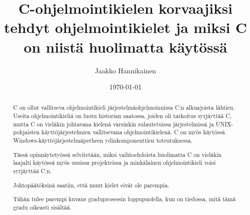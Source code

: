 \documentclass[gradu]{tktltiki}
\begin{document}
\title{C-ohjelmointikielen korvaajiksi tehdyt ohjelmointikielet ja miksi C on
niistä huolimatta käytössä}
\author{Jaakko Hannikainen}
\date{\today}

\maketitle




\begin{abstract}
    C on ollut vallitseva ohjelmointikieli järjestelmäohjelmoinnissa C:n
    alkuajoista lähtien. Useita ohjelmointikieliä on luotu historian saatossa,
    joiden oli tarkoitus syrjäyttää C, mutta C on vieläkin johtavana kielenä
    varsinkin sulautetuissa järjestelmissä ja UNIX-pohjaisten
    käyttöjärjestelmien vallitsevana ohjelmointikielenä. C on myös käytössä
    Windows-käyttöjärjestelmäperheen ydinkomponenttien toteutuksessa.
    
    Tässä opinnäytetyössä selvitetään, miksi vaihtoehdoista huolimatta C on vieläkin
    laajalti käytössä myös uusissa projekteissa ja minkälainen ohjelmointikieli
    voisi syrjäyttää C:n.
    
    Johtopäätöksinä saatiin, että muut kielet eivät ole parempia.

    Tähän tulee parempi kuvaus graduprosessin loppupuolella, kun on
    tiedossa, mitä tämä gradu oikeasti sisältää.
\end{abstract}

\newpage
\tocbeginshere

\mytableofcontents


\newpage

\newpage

\newpage

\newpage

\newpage

%


\appendixbeginhere



\appendixendhere
\end{document}
